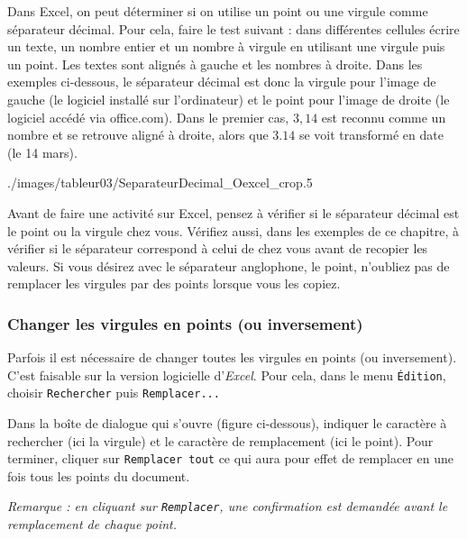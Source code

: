 \vspace{6pt}

Dans Excel, on peut déterminer si on utilise un point ou une virgule comme séparateur décimal. Pour cela, faire le test suivant : dans différentes cellules écrire un texte, un nombre entier et un nombre à virgule en utilisant une virgule puis un point. Les textes sont alignés à gauche et les nombres à droite. Dans les exemples ci-dessous, le séparateur décimal est donc la virgule pour l'image de gauche (le logiciel installé sur l'ordinateur) et le point pour l'image de droite (le logiciel accédé via office.com). Dans le premier cas, $3,14$ est reconnu comme un nombre et se retrouve aligné à droite, alors que $3.14$ se voit transformé en date (le 14 mars).

%  
{./images/tableur03/SeparateurDecimal_Oexcel_crop}{.5\textwidth}

Avant de faire une activité sur Excel, pensez à vérifier si le séparateur décimal est le point ou la virgule chez vous. Vérifiez aussi, dans les exemples de ce chapitre, à vérifier si le séparateur correspond à celui de chez vous avant de recopier les valeurs. Si vous désirez avec le séparateur anglophone, le point, n'oubliez pas de remplacer les virgules par des points lorsque vous les copiez.

\subsubsection{Changer les virgules en points (ou inversement)}

Parfois il est nécessaire de changer toutes les virgules en points (ou inversement). C'est faisable sur la version logicielle d'\emph{Excel}. Pour cela, dans le menu \texttt{Édition}, choisir \texttt{Rechercher} puis \texttt{Remplacer...}


Dans la boîte de dialogue qui s'ouvre (figure ci-dessous), indiquer le caractère à rechercher  (ici la virgule) et le caractère de remplacement  (ici le point). Pour terminer, cliquer sur \texttt{Remplacer tout}  ce qui aura pour effet de remplacer en une fois tous les points du document.

\emph{Remarque : en cliquant sur \texttt{Remplacer}, une confirmation est demandée avant le remplacement de chaque point.}

